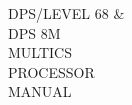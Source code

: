 \thispagestyle{empty}

\begin{flushleft}
\mybox{\textbf{\Huge \textcolor{white}{HONEYWELL}}}
\end{flushleft}

\begin{flushleft}
\Huge
\hspace{14ex}DPS/LEVEL 68 \& \\
\hspace{14ex}DPS 8M \\
\hspace{14ex}MULTICS \\
\hspace{14ex}PROCESSOR \\
\hspace{14ex}MANUAL
\end{flushleft}

\vfill
\mybox{
\begin{flushright}
{\textbf{\Huge \textcolor{white}{HARDWARE}}}
\end{flushright}
}





